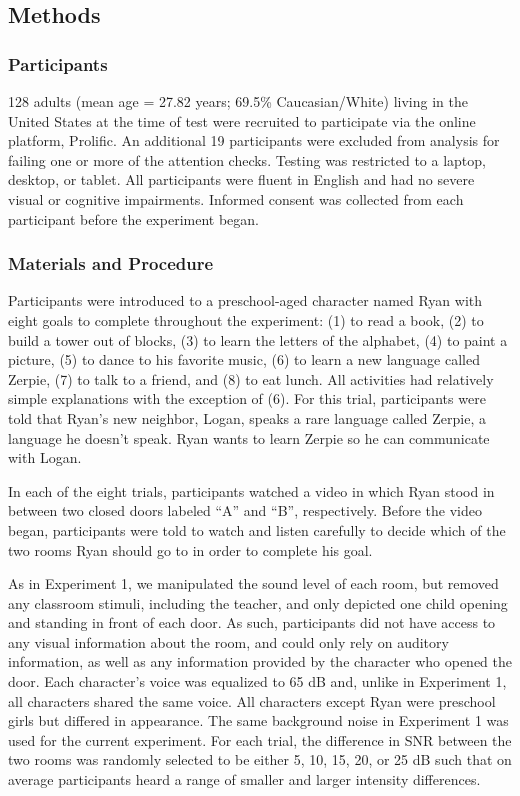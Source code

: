 \documentclass[10pt, letterpaper]{article}
\begin{document}
\hypertarget{methods-2}{%
\subsection{Methods}\label{methods-2}}

\hypertarget{participants-2}{%
\subsubsection{Participants}\label{participants-2}}

128 adults (mean age = 27.82 years; 69.5\% Caucasian/White) living in
the United States at the time of test were recruited to participate via
the online platform, Prolific. An additional 19 participants were
excluded from analysis for failing one or more of the attention checks.
Testing was restricted to a laptop, desktop, or tablet. All participants
were fluent in English and had no severe visual or cognitive
impairments. Informed consent was collected from each participant before
the experiment began.

\hypertarget{materials-and-procedure-2}{%
\subsubsection{Materials and
Procedure}\label{materials-and-procedure-2}}

Participants were introduced to a preschool-aged character named Ryan
with eight goals to complete throughout the experiment: (1) to read a
book, (2) to build a tower out of blocks, (3) to learn the letters of
the alphabet, (4) to paint a picture, (5) to dance to his favorite
music, (6) to learn a new language called Zerpie, (7) to talk to a
friend, and (8) to eat lunch. All activities had relatively simple
explanations with the exception of (6). For this trial, participants
were told that Ryan's new neighbor, Logan, speaks a rare language called
Zerpie, a language he doesn't speak. Ryan wants to learn Zerpie so he
can communicate with Logan.

In each of the eight trials, participants watched a video in which Ryan
stood in between two closed doors labeled ``A'' and ``B'', respectively.
Before the video began, participants were told to watch and listen
carefully to decide which of the two rooms Ryan should go to in order to
complete his goal.

As in Experiment 1, we manipulated the sound level of each room, but
removed any classroom stimuli, including the teacher, and only depicted
one child opening and standing in front of each door. As such,
participants did not have access to any visual information about the
room, and could only rely on auditory information, as well as any
information provided by the character who opened the door. Each
character's voice was equalized to 65 dB and, unlike in Experiment 1,
all characters shared the same voice. All characters except Ryan were
preschool girls but differed in appearance. The same background noise in
Experiment 1 was used for the current experiment. For each trial, the
difference in SNR between the two rooms was randomly selected to be
either 5, 10, 15, 20, or 25 dB such that on average participants heard a
range of smaller and larger intensity differences.
\end{document}
